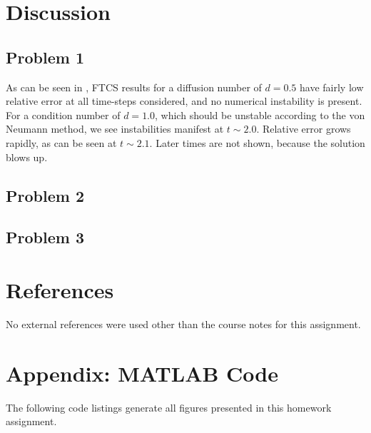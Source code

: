 \documentclass[11pt]{article}
\begin{document}
\section{Discussion} %

\subsection{Problem 1}

As can be seen in , FTCS results for a diffusion number of $d=0.5$ have fairly low relative error at all time-steps considered, and no numerical instability is present. For a condition number of $d=1.0$, which should be unstable according to the von Neumann method, we see instabilities manifest at $t \sim 2.0$. Relative error grows rapidly, as can be seen at $t \sim 2.1$. Later times are not shown, because the solution blows up.

\subsection{Problem 2}

\subsection{Problem 3}

\section{References} %

No external references were used other than the course notes for this assignment.

\section*{Appendix: MATLAB Code} %

The following code listings generate all figures presented in this homework assignment.


\end{document}
